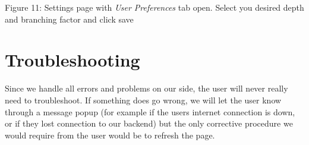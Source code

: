 \documentclass[hidelinks,english]{article}
\begin{document}
    \begin{center}
      Figure 11: Settings page with \textit{User Preferences} tab open. Select you desired depth and branching factor and click save
      \label{settings page 3}
    \end{center}
    
    \section{Troubleshooting}
    Since we handle all errors and problems on our side, the user will never really need to troubleshoot. If something does go wrong, we will let the user know through a message popup (for example if the users internet connection is down, or if they lost connection to our backend) but the only corrective procedure we would require from the user would be to refresh the page. 
\end{document}
